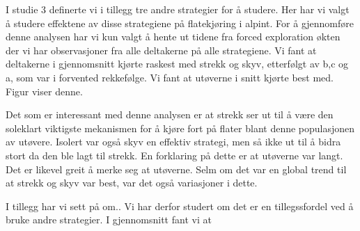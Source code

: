 \documentclass[letterpaper,10pt]{article}
\begin{document}
I studie 3 definerte vi i tillegg tre andre strategier for å studere. Her har vi valgt å studere effektene av disse strategiene på flatekjøring i alpint. For å gjennomføre denne analysen har vi kun valgt å hente ut tidene fra forced exploration økten der vi har observasjoner fra alle deltakerne på alle strategiene. Vi fant at deltakerne i gjennomsnitt kjørte raskest med strekk og skyv, etterfølgt av b,c og a, som var i forvented rekkefølge. Vi fant at utøverne i snitt kjørte best med. Figur viser denne. 

Det som er interessant med denne analysen er at strekk ser ut til å være den soleklart viktigste mekanismen for å kjøre fort på flater blant denne populasjonen av utøvere. Isolert var også skyv en effektiv strategi, men så ikke ut til å bidra stort da den ble lagt til strekk. En forklaring på dette er at utøverne var langt. Det er likevel greit å merke seg at utøverne. Selm om det var en global trend til at strekk og skyv var best, var det også variasjoner i dette. 

I tillegg har vi sett på om.. Vi har derfor studert om det er en tillegssfordel ved å bruke andre strategier. I gjennomsnitt fant vi at 
\end{document}
